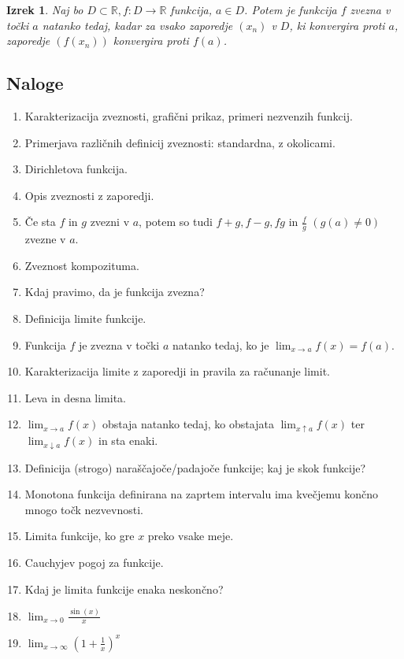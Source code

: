 \documentclass[a4paper,12pt]{report}
\newtheorem{izrek}{Izrek}[section]
\begin{document}
\begin{izrek}
    Naj bo $D \subset \mathbb{R}, f: D \to \mathbb{R}$ funkcija, $a \in D$. Potem je funkcija $f$ 
    zvezna v točki $a$ natanko tedaj, kadar za vsako zaporedje $(x_n)$ v $D$, ki konvergira proti $a$, 
    zaporedje $(f(x_n))$ konvergira proti $f(a)$.
\end{izrek}

\subsection*{Naloge}

\begin{enumerate}
    \item Karakterizacija zveznosti, grafični prikaz, primeri nezvenzih funkcij.
    \item Primerjava različnih definicij zveznosti: standardna, z okolicami.
    \item Dirichletova funkcija.
    \item Opis zveznosti z zaporedji.
    \item Če sta $f$ in $g$ zvezni v $a$, potem so tudi $f+g, f-g, fg $ in $\frac{f}{g}$ $(g(a) \neq 0)$ zvezne v $a$.
    \item Zveznost kompozituma.
    \item Kdaj pravimo, da je funkcija zvezna?
    \item Definicija limite funkcije.
    \item Funkcija $f$ je zvezna v točki $a$ natanko tedaj, ko je $\lim_{x \to a} f(x) = f(a)$.
    \item Karakterizacija limite z zaporedji in pravila za računanje limit.
    \item Leva in desna limita.
    \item $\lim_{x \to a} f(x)$ obstaja natanko tedaj, ko obstajata $\lim_{x \uparrow a} f(x)$ ter $\lim_{x \downarrow a} f(x)$ in sta enaki.
    \item Definicija (strogo) naraščajoče/padajoče funkcije; kaj je skok funkcije?
    \item Monotona funkcija definirana na zaprtem intervalu ima kvečjemu končno mnogo točk nezvevnosti.
    \item Limita funkcije, ko gre $x$ preko vsake meje.
    \item Cauchyjev pogoj za funkcije.
    \item Kdaj je limita funkcije enaka neskončno?
    \item $\lim_{x \to 0} \frac{\sin(x)}{x}$
    \item $\lim_{x \to \infty}(1 + \frac{1}{x})^x$

\end{enumerate}
\end{document}
